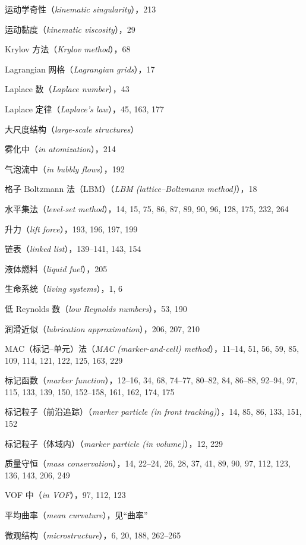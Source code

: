 \documentclass[11pt,a4paper,openany,fontset=none]{ctexbook}
\begin{document}
运动学奇性（\textit{kinematic singularity}），213\par
运动黏度（\textit{kinematic viscosity}），29\par
Krylov 方法（\textit{Krylov method}），68\par
Lagrangian 网格（\textit{Lagrangian grids}），17\par
Laplace 数（\textit{Laplace number}），43\par
Laplace 定律（\textit{Laplace’s law}），45, 163, 177\par
大尺度结构（\textit{large-scale structures}）\par
雾化中（\textit{in atomization}），214\par
气泡流中（\textit{in bubbly flows}），192\par
格子 Boltzmann 法（LBM）（\textit{LBM (lattice–Boltzmann method)}），18\par
水平集法（\textit{level-set method}），14, 15, 75, 86, 87, 89, 90, 96, 128, 175, 232, 264\par
升力（\textit{lift force}），193, 196, 197, 199\par
链表（\textit{linked list}），139--141, 143, 154\par
液体燃料（\textit{liquid fuel}），205\par
生命系统（\textit{living systems}），1, 6\par
低 Reynolds 数（\textit{low Reynolds numbers}），53, 190\par
润滑近似（\textit{lubrication approximation}），206, 207, 210\par
MAC（标记--单元）法（\textit{MAC (marker-and-cell) method}），11--14, 51, 56, 59, 85, 109, 114, 121, 122, 125, 163, 229\par
标记函数（\textit{marker function}），12--16, 34, 68, 74--77, 80--82, 84, 86--88, 92--94, 97, 115, 133, 139, 150, 152--158, 161, 162, 174, 175\par
标记粒子（前沿追踪）（\textit{marker particle (in front tracking)}），14, 85, 86, 133, 151, 152\par
标记粒子（体域内）（\textit{marker particle (in volume)}），12, 229\par
质量守恒（\textit{mass conservation}），14, 22--24, 26, 28, 37, 41, 89, 90, 97, 112, 123, 136, 143, 206, 249\par
VOF 中（\textit{in VOF}），97, 112, 123\par
平均曲率（\textit{mean curvature}），见“曲率”\par
微观结构（\textit{microstructure}），6, 20, 188, 262--265\par
\end{document}
